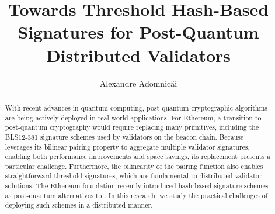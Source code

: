 \documentclass{iacrtrans}
\author{Alexandre Adomnic\u{a}i}%
\institute{
  DV Labs, \email{alexandre@dvlabs.tech}
}
\title{Towards Threshold Hash-Based Signatures for Post-Quantum Distributed Validators}
\begin{document}
\maketitle




\begin{abstract}
With recent advances in quantum computing, post-quantum cryptographic algorithms are being actively deployed in real-world applications.
For Ethereum, a transition to post-quantum cryptography would require replacing many primitives, including the \textsf{BLS12-381} signature schemes used by validators on the beacon chain.
Because \BLS leverages its bilinear pairing property to aggregate multiple validator signatures, enabling both performance improvements and space savings, its replacement presents a particular challenge.
Furthermore, the bilinearity of the pairing function also enables straightforward threshold signatures, which are fundamental to distributed validator solutions.
The Ethereum foundation recently introduced hash-based signature schemes as post-quantum alternatives to \BLS. 
In this research, we study the practical challenges of deploying such schemes in a distributed manner.
\end{abstract}
















\end{document}
